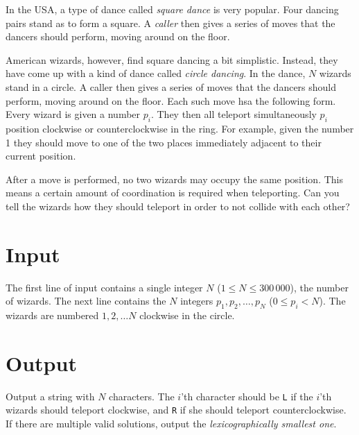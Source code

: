 In the USA, a type of dance called \emph{square dance} is very popular.
Four dancing pairs stand as to form a square.
A \emph{caller} then gives a series of moves that the dancers should perform, moving around on the floor.

American wizards, however, find square dancing a bit simplistic.
Instead, they have come up with a kind of dance called \emph{circle dancing}.
In the dance, $N$ wizards stand in a circle.
A caller then gives a series of moves that the dancers should perform, moving around on the floor.
Each such move hsa the following form.
Every wizard is given a number $p_i$.
They then all teleport simultaneously $p_i$ position clockwise or counterclockwise in the ring.
For example, given the number 1 they should move to one of the two places immediately adjacent to their current position.

After a move is performed, no two wizards may occupy the same position.
This means a certain amount of coordination is required when teleporting.
Can you tell the wizards how they should teleport in order to not collide with each other?

\section*{Input}
The first line of input contains a single integer $N$ ($1 \le N \le 300\,000$), the number of wizards.
The next line contains the $N$ integers $p_1, p_2, \dots, p_N$ ($0 \le p_i < N$).
The wizards are numbered $1, 2, \dots N$ clockwise in the circle.

\section*{Output}
Output a string with $N$ characters.
The $i$'th character should be \texttt{L} if the $i$'th wizards should teleport clockwise, and \texttt{R} if she should teleport counterclockwise.
If there are multiple valid solutions, output the \emph{lexicographically smallest one}.

